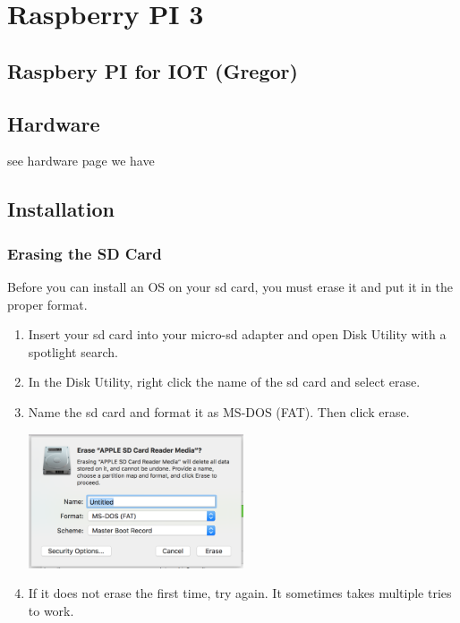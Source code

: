 

\chapter{Raspberry PI 3}\label{raspberry-pi-3}

\FILENAME

\section{Raspbery PI for IOT
(Gregor)}\label{raspbery-pi-for-iot-gregor}

\section{Hardware}\label{hardware}

see hardware page we have

\section{Installation}\label{installation}

\subsection{Erasing the SD Card}\label{erasing-the-sd-card}

Before you can install an OS on your sd card, you must erase it and put
it in the proper format.

\begin{enumerate}
\def\labelenumi{\arabic{enumi}.}
\tightlist
\item
  Insert your sd card into your micro-sd adapter and open Disk Utility
  with a spotlight search.
\item
  In the Disk Utility, right click the name of the sd card and select
  erase.
\item
  Name the sd card and format it as MS-DOS (FAT). Then click erase.

  \includegraphics[width=0.5\textwidth]{images/diskutil.png}

\item
  If it does not erase the first time, try again. It sometimes takes
  multiple tries to work.
\end{enumerate}

